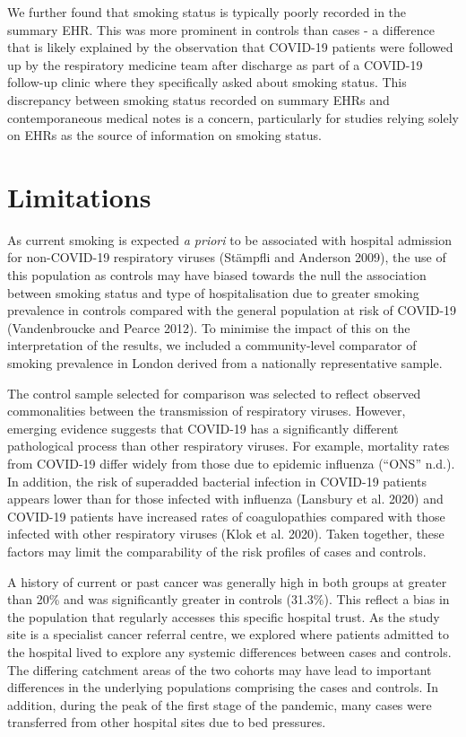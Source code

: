 \documentclass[
]{article}
\begin{document}
We further found that smoking status is typically poorly recorded in the
summary EHR. This was more prominent in controls than cases - a
difference that is likely explained by the observation that COVID-19
patients were followed up by the respiratory medicine team after
discharge as part of a COVID-19 follow-up clinic where they specifically
asked about smoking status. This discrepancy between smoking status
recorded on summary EHRs and contemporaneous medical notes is a concern,
particularly for studies relying solely on EHRs as the source of
information on smoking status.

\hypertarget{limitations}{%
\section{\texorpdfstring{\textbf{Limitations}}{Limitations}}\label{limitations}}

As current smoking is expected \emph{a priori} to be associated with
hospital admission for non-COVID-19 respiratory viruses (Stämpfli and
Anderson 2009), the use of this population as controls may have biased
towards the null the association between smoking status and type of
hospitalisation due to greater smoking prevalence in controls compared
with the general population at risk of COVID-19 (Vandenbroucke and
Pearce 2012). To minimise the impact of this on the interpretation of
the results, we included a community-level comparator of smoking
prevalence in London derived from a nationally representative sample.

The control sample selected for comparison was selected to reflect
observed commonalities between the transmission of respiratory viruses.
However, emerging evidence suggests that COVID-19 has a significantly
different pathological process than other respiratory viruses. For
example, mortality rates from COVID-19 differ widely from those due to
epidemic influenza (``ONS'' n.d.). In addition, the risk of superadded
bacterial infection in COVID-19 patients appears lower than for those
infected with influenza (Lansbury et al. 2020) and COVID-19 patients
have increased rates of coagulopathies compared with those infected with
other respiratory viruses (Klok et al. 2020). Taken together, these
factors may limit the comparability of the risk profiles of cases and
controls.

A history of current or past cancer was generally high in both groups at
greater than 20\% and was significantly greater in controls (31.3\%).
This reflect a bias in the population that regularly accesses this
specific hospital trust. As the study site is a specialist cancer
referral centre, we explored where patients admitted to the hospital
lived to explore any systemic differences between cases and controls.
The differing catchment areas of the two cohorts may have lead to
important differences in the underlying populations comprising the cases
and controls. In addition, during the peak of the first stage of the
pandemic, many cases were transferred from other hospital sites due to
bed pressures.
\end{document}
